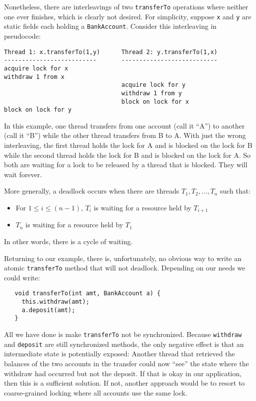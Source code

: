 \documentclass[10pt]{article}
\begin{document}
Nonetheless, there are interleavings of two {\tt transferTo}
operations where neither one ever finishes, which is clearly not
desired.  For simplicity, suppose {\tt x} and {\tt y} are static
fields each holding a {\tt BankAccount}.  Consider this interleaving
in pseudocode:

\begin{verbatim}
Thread 1: x.transferTo(1,y)      Thread 2: y.transferTo(1,x)
--------------------------       ---------------------------
acquire lock for x     
withdraw 1 from x
                                 acquire lock for y
                                 withdraw 1 from y
                                 block on lock for x
block on lock for y
\end{verbatim}

In this example, one thread transfers from one account (call it ``A'')
to another (call it ``B'') while the other thread transfers from B to
A.  With just the wrong interleaving, the first thread holds the lock
for A and is blocked on the lock for B while the second thread holds
the lock for B and is blocked on the lock for A.  So both are waiting
for a lock to be released by a thread that is blocked.  They will wait
forever.

More generally, a deadlock occurs when there are threads $T_1, T_2,
..., T_n$ such that:
\begin{itemize}
\item For $1\leq i\leq (n-1)$, $T_i$ is waiting for a resource held by
  $T_{i+1}$ 
\item $T_n$ is waiting for a resource held by $T_1$
\end{itemize}
In other words, there is a cycle of waiting.  

Returning to our example, there is, unfortunately, no obvious way to
write an atomic {\tt transferTo} method that will not deadlock.
Depending on our needs we could write:
\begin{verbatim}
   void transferTo(int amt, BankAccount a) {
     this.withdraw(amt);
     a.deposit(amt);
   }
\end{verbatim}
All we have done is make {\tt transferTo} not be synchronized.
Because {\tt withdraw} and {\tt deposit} are still synchronized
methods, the only negative effect is that an intermediate state is
potentially exposed:  Another thread that retrieved the balances of
the two accounts in the transfer could now ``see'' the state where the
withdraw had occurred but not the deposit.  If that is okay in our
application, then this is a sufficient solution.  If not, another
approach would be to resort to coarse-grained locking where all
accounts use the same lock.  
\end{document}
